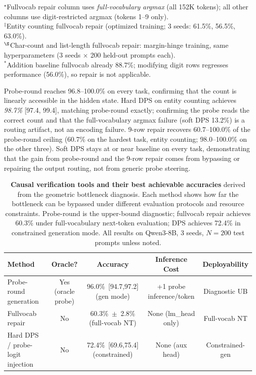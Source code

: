 \documentclass{article}
\begin{document}
\begin{table}[t]
\footnotesize $^\star$Fullvocab repair column uses \emph{full-vocabulary argmax} (all 152K tokens); all other columns use digit-restricted argmax (tokens 1--9 only).\\
\footnotesize $^{\ddagger}$Entity counting fullvocab repair (optimized training; 3 seeds: 61.5\%, 56.5\%, 63.0\%).\\
\footnotesize $^{\S}$Char-count and list-length fullvocab repair: margin-hinge training, same hyperparameters (3 seeds $\times$ 200 held-out prompts each).\\
\footnotesize $^{\ast}$Addition baseline fullvocab already 88.7\%; modifying digit rows regresses performance (56.0\%), so repair is not applicable.
\end{table}

Probe-round reaches 96.8--100.0\% on every task, confirming that the count is
linearly accessible in the hidden state.
Hard DPS on entity counting achieves \emph{98.7\%} [97.4, 99.4], matching probe-round exactly; confirming the probe reads the correct count and that the full-vocabulary argmax failure (soft DPS 13.2\%) is a routing artifact, not an encoding failure.
9-row repair recovers 60.7--100.0\% of the probe-round ceiling (60.7\% on the hardest task,
entity counting; 98.0--100.0\% on the other three).
Soft DPS stays at or near baseline on every task, demonstrating that the gain
from probe-round and the 9-row repair comes from bypassing or repairing the output routing, not from generic probe steering.

\begin{table}[h]
\centering
\small
\caption{\textbf{Causal verification tools and their best achievable accuracies} derived from the geometric bottleneck diagnosis. Each method shows how far the bottleneck can be bypassed under different evaluation protocols and resource constraints. Probe-round is the upper-bound diagnostic; fullvocab repair achieves 60.3\% under full-vocabulary next-token evaluation; DPS achieves 72.4\% in constrained generation mode. All results on Qwen3-8B, 3 seeds, $N=200$ test prompts unless noted.}
\label{tab:solutions_summary}
\begin{tabular}{lcccc}
\toprule
\textbf{Method} & \textbf{Oracle?} & \textbf{Accuracy} & \textbf{Inference Cost} & \textbf{Deployability} \\
\midrule
Probe-round generation & Yes (oracle probe) & 96.0\%~[94.7,97.2] (gen mode) & +1 probe inference/token & Diagnostic UB \\
Fullvocab repair & No & 60.3\%~$\pm$~2.8\% (full-vocab NT) & None (lm\_head only) & Full-vocab NT \\
Hard DPS / probe-logit injection & No & 72.4\%~[69.6,75.4] (constrained) & None (aux head) & Constrained-gen \\
\bottomrule
\end{tabular}
\end{table}
\end{document}
